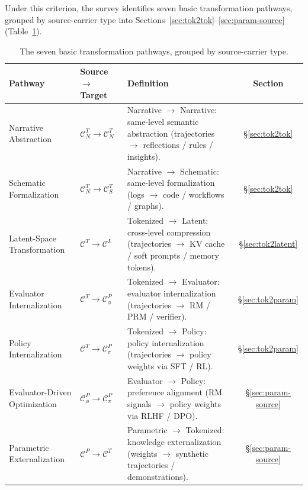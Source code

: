 Under this criterion, the survey identifies seven basic transformation pathways, grouped by source-carrier type into Sections~\ref{sec:tok2tok}--\ref{sec:param-source} (Table~\ref{tab:pathways}).

\begin{table}[t]
\centering
\caption{The seven basic transformation pathways, grouped by source-carrier type.}
\label{tab:pathways}
\footnotesize
\begin{tabular}{@{}l l p{} c@{}}
\toprule
Pathway & Source $\rightarrow$ Target & Definition & Section \\
\midrule
Narrative Abstraction & $\mathcal{C}^T_N \rightarrow \mathcal{C}^T_N$ & Narrative $\rightarrow$ Narrative: same-level semantic abstraction (trajectories $\rightarrow$ reflections / rules / insights). & \S\ref{sec:tok2tok} \\
Schematic Formalization & $\mathcal{C}^T_N \rightarrow \mathcal{C}^T_S$ & Narrative $\rightarrow$ Schematic: same-level formalization (logs $\rightarrow$ code / workflows / graphs). & \S\ref{sec:tok2tok} \\
Latent-Space Transformation & $\mathcal{C}^T \rightarrow \mathcal{C}^L$ & Tokenized $\rightarrow$ Latent: cross-level compression (trajectories $\rightarrow$ KV cache / soft prompts / memory tokens). & \S\ref{sec:tok2latent} \\
Evaluator Internalization & $\mathcal{C}^T \rightarrow \mathcal{C}^P_\phi$ & Tokenized $\rightarrow$ Evaluator: evaluator internalization (trajectories $\rightarrow$ RM / PRM / verifier). & \S\ref{sec:tok2param} \\
Policy Internalization & $\mathcal{C}^T \rightarrow \mathcal{C}^P_\pi$ & Tokenized $\rightarrow$ Policy: policy internalization (trajectories $\rightarrow$ policy weights via SFT / RL). & \S\ref{sec:tok2param} \\
Evaluator-Driven Optimization & $\mathcal{C}^P_\phi \rightarrow \mathcal{C}^P_\pi$ & Evaluator $\rightarrow$ Policy: preference alignment (RM signals $\rightarrow$ policy weights via RLHF / DPO). & \S\ref{sec:param-source} \\
Parametric Externalization & $\mathcal{C}^P \rightarrow \mathcal{C}^T$ & Parametric $\rightarrow$ Tokenized: knowledge externalization (weights $\rightarrow$ synthetic trajectories / demonstrations). & \S\ref{sec:param-source} \\
\bottomrule
\end{tabular}
\end{table}

